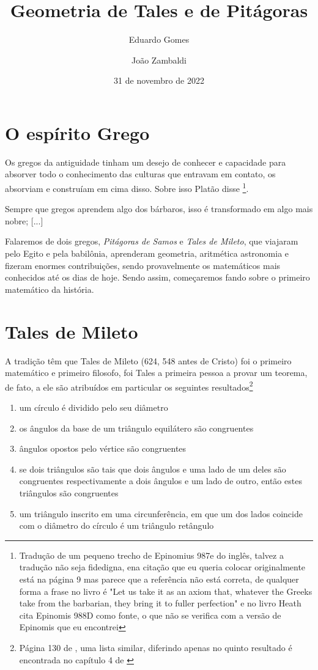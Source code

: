 \documentclass{article}
\title  {Geometria de Tales e de Pitágoras}
\author {Eduardo Gomes \and João Zambaldi}
\date   {31 de novembro de 2022}
\begin{document}
\maketitle

\section {O espírito Grego} 

Os gregos da antiguidade tinham um desejo de conhecer e capacidade
para absorver todo o conhecimento das culturas que entravam em contato,
os absorviam e construíam em cima disso. Sobre isso Platão disse \footnote{Tradução de um pequeno trecho de Epinomius 987e do inglês, talvez a tradução não seja fidedigna, ena citação que eu queria colocar originalmente está na página 9 \cite{Heath} mas parece que a referência não está correta, de qualquer forma a frase no livro é "Let us take it as an axiom that, whatever the Greeks take from the barbarian, they bring it to fuller perfection" e no livro Heath cita Epinomis 988D como fonte, o que não se verifica com a versão de Epinomis que eu encontrei}.

\begin{framed}
	Sempre que gregos aprendem algo dos bárbaros, isso é 
	transformado em algo mais nobre; [...]
\end{framed}

Falaremos de dois gregos, \emph{Pitágoras de Samos} e \emph{Tales de Mileto},
que viajaram pelo Egito e pela babilônia, aprenderam geometria, aritmética
astronomia e fizeram enormes contribuições, sendo provavelmente os matemáticos
mais conhecidos até os dias de hoje. Sendo assim, começaremos fando sobre o primeiro
matemático da história.


\section {Tales de Mileto}

A tradição têm que Tales de Mileto (624, 548 antes de Cristo) foi o primeiro
matemático e primeiro filosofo, foi Tales a primeira pessoa a provar um teorema,
de fato, a ele são atribuídos em particular os seguintes resultados\footnote{
Página 130 de \cite{Heath}, uma lista similar, diferindo apenas no quinto resultado
é encontrada no capítulo 4 de \cite{Boyer}}
\begin{enumerate}
	\item um círculo é dividido pelo seu diâmetro
	\item os ângulos da base de um triângulo equilátero são congruentes
	\item ângulos opostos pelo vértice são congruentes
	\item se dois triângulos são tais que dois ângulos e uma lado de um deles são
		congruentes respectivamente a dois ângulos e um lado de outro, então
		estes triângulos são congruentes
	\item um triângulo inscrito em uma circunferência, em que um dos lados
		coincide com o diâmetro do círculo é um triângulo retângulo
\end{enumerate}
\end{document}
